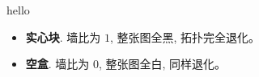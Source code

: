 \documentclass{article}
\begin{document}
hello
\begin{itemize}
  \item {\bfseries 实心块}. 墙比为 $1$, 整张图全黑, 拓扑完全退化。
  \item {\bfseries 空盒}. 墙比为 $0$, 整张图全白, 同样退化。
\end{itemize}
\end{document}

